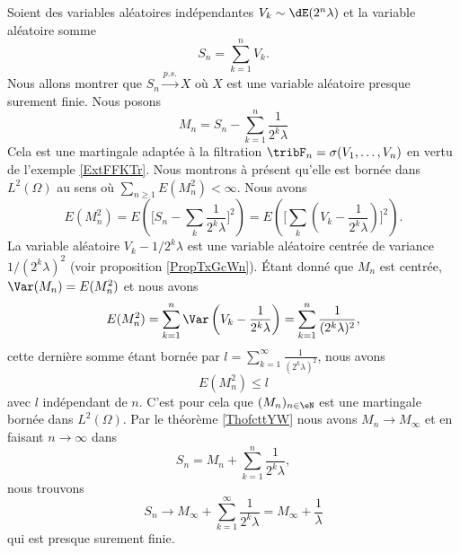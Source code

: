 \begin{example}
    Soient des variables aléatoires indépendantes \( V_k\sim\dE(2^n\lambda)\) et la variable aléatoire somme
    \begin{equation}
        S_n=\sum_{k=1}^nV_k.
    \end{equation}
    Nous allons montrer que \( S_n\stackrel{p.s.}{\longrightarrow}X\) où \( X\) est une variable aléatoire presque surement finie. Nous posons
    \begin{equation}
        M_n=S_n-\sum_{k=1}^n\frac{1}{ 2^k\lambda }
    \end{equation}
    Cela est une martingale adaptée à la filtration \( \tribF_n=\sigma(V_1,\ldots, V_n)\) en vertu de l'exemple \ref{ExtFFKTr}. Nous montrons à présent qu'elle est bornée dans \( L^2(\Omega)\) au sens où \( \sum_{n\geq 1}E(M_n^2)<\infty\). Nous avons
    \begin{equation}
        E(M_n^2)=E\left( \big[ S_n-\sum_k\frac{1}{ 2^k\lambda } \big]^2 \right)=E\left( \big[ \sum_k(V_k-\frac{1}{ 2^k\lambda }) \big]^2 \right).
    \end{equation}
    La variable aléatoire \( V_k-1/2^k\lambda\) est une variable aléatoire centrée de variance \( 1/(2^k\lambda)^2\) (voir proposition \ref{PropTxGcWn}). Étant donné que \( M_n\) est centrée, \( \Var(M_n)=E(M_n^2)\) et nous avons
    \begin{equation}
        E(M_n^2)=\sum_{k=1}^n\Var\left( V_k-\frac{1}{ 2^k\lambda } \right)=\sum_{k=1}^n\frac{1}{ (2^k\lambda)^2 },
    \end{equation}
    cette dernière somme étant bornée par \( l=\sum_{k=1}^{\infty}\frac{1}{ (2^k\lambda)^2 }\), nous avons
    \begin{equation}
        E(M_n^2)\leq l
    \end{equation}
    avec \( l\) indépendant de \( n\). C'est pour cela que \( (M_n)_{n\in \eN}\) est une martingale bornée dans \( L^2(\Omega)\). Par le théorème \ref{ThofcttYW} nous avons \( M_n\to M_{\infty}\) et en faisant \( n\to \infty\) dans
    \begin{equation}
        S_n=M_n+\sum_{k=1}^n\frac{1}{ 2^k\lambda },
    \end{equation}
    nous trouvons
    \begin{equation}
        S_n\to M_{\infty}+\sum_{k=1}^{\infty}\frac{1}{ 2^k\lambda }=M_{\infty}+\frac{1}{ \lambda }
    \end{equation}
    qui est presque surement finie.
\end{example}

